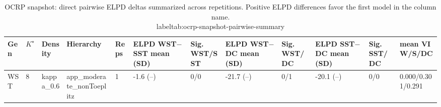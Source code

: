 \begin{table}[!h]
\centering
\caption{OCRP snapshot: direct pairwise ELPD deltas summarized across repetitions. Positive ELPD differences favor the first model in the column name.\\label{tab:ocrp-snapshot-pairwise-summary}}
\centering
\begin{tabular}[t]{llllllllllll}
\toprule
Gen & $K^\star$ & Density & Hierarchy & Reps & ELPD WST$-$SST mean (SD) & Sig. WST/SST & ELPD WST$-$DC mean (SD) & Sig. WST/DC & ELPD SST$-$DC mean (SD) & Sig. SST/DC & mean VI W/S/DC\\
\midrule
WST & 8 & kappa_0.6 & app_moderate_nonToeplitz & 1 & -1.6 (--) & 0/0 & -21.7 (--) & 0/1 & -20.1 (--) & 0/0 & 0.000/0.301/0.291\\
\bottomrule
\end{tabular}
\end{table}
